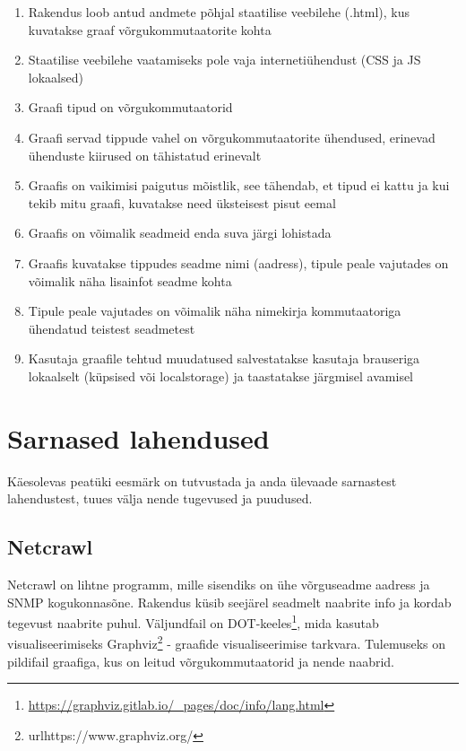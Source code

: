 \documentclass[12pt]{article}
\begin{document}
\begin{enumerate}
    \item Rakendus loob antud andmete põhjal staatilise veebilehe (.html), kus kuvatakse
    graaf võrgukommutaatorite kohta
    \item Staatilise veebilehe vaatamiseks pole vaja internetiühendust (CSS ja JS lokaalsed)
    \item \label{itm:req:nodesSwitches} Graafi tipud on võrgukommutaatorid
    \item \label{itm:req:edgesSwitchConnections} Graafi servad tippude vahel on võrgukommutaatorite
    ühendused, erinevad ühenduste kiirused on tähistatud erinevalt
    \item \label{itm:req:graphLayout}Graafis on vaikimisi paigutus mõistlik, see tähendab, et tipud
    ei kattu ja kui tekib mitu graafi, kuvatakse need üksteisest pisut eemal
    \item \label{itm:req:dragSwitches} Graafis on võimalik seadmeid enda suva järgi lohistada
    \item \label{itm:req:popouts} Graafis kuvatakse tippudes seadme nimi (aadress), tipule peale
    vajutades on võimalik näha lisainfot seadme kohta
    \item \label{itm:req:popoutsOtherDevices}Tipule peale vajutades on võimalik näha nimekirja
    kommutaatoriga ühendatud teistest seadmetest
    \item \label{itm:req:saveChanges} Kasutaja graafile tehtud muudatused salvestatakse
    kasutaja brauseriga lokaalselt (küpsised või localstorage) ja taastatakse järgmisel avamisel
\end{enumerate}



\newpage
\section{Sarnased lahendused} \label{similar}

Käesolevas peatüki eesmärk on tutvustada ja anda ülevaade sarnastest lahendustest,
tuues välja nende tugevused ja puudused.

\subsection{Netcrawl}
Netcrawl on lihtne programm, mille sisendiks on ühe võrguseadme aadress ja SNMP kogukonnasõne.
Rakendus küsib seejärel seadmelt naabrite info ja kordab tegevust naabrite puhul.
Väljundfail on DOT-keeles\footnote{\url{https://graphviz.gitlab.io/_pages/doc/info/lang.html}},
mida kasutab visualiseerimiseks Graphviz\footnote{url{https://www.graphviz.org/}} - graafide
visualiseerimise tarkvara.
Tulemuseks on pildifail graafiga, kus on leitud võrgukommutaatorid ja nende naabrid.
~\cite{netcrawl}
\end{document}
